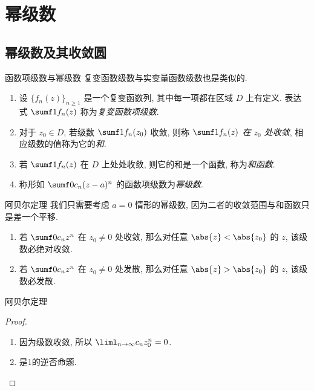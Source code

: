 \section{幂级数}


\subsection{幂级数及其收敛圆}

\begin{frame}{函数项级数与幂级数}
	\onslide<+->
	复变函数级数与实变量函数级数也是类似的.
	\onslide<+->
	\begin{definition}[near]
		\begin{enumerate}
			\item 设 $\{f_n(z)\}_{n\ge 1}$ 是一个复变函数列, 其中每一项都在区域 $D$ 上有定义.
			表达式 $\sumf1 f_n(z)$ 称为\emph{复变函数项级数}.
			\item 对于 $z_0\in D$, 若级数 $\sumf1 f_n(z_0)$ 收敛, 则称 \emph{$\sumf1 f_n(z)$ 在 $z_0$ 处收敛}, 相应级数的值称为它的\emph{和}.
			\item 若 $\sumf1 f_n(z)$ 在 $D$ 上处处收敛, 则它的和是一个函数, 称为\emph{和函数}.
			\item 称形如 $\sumf0 c_n(z-a)^n$ 的函数项级数为\emph{幂级数}.
		\end{enumerate}\meddel
	\end{definition}
\end{frame}


\begin{frame}{阿贝尔定理}
	\onslide<+->
	我们只需要考虑 $a=0$ 情形的幂级数, 因为二者的收敛范围与和函数只是差一个平移.
	\onslide<+->
	\begin{theorem*}[][阿贝尔定理]
		\begin{enumerate}
			\item 若 $\sumf0 c_nz^n$ 在 $z_0\neq 0$ 处收敛, 那么对任意 $\abs{z}<\abs{z_0}$ 的 $z$, 该级数必绝对收敛.
			\item 若 $\sumf0 c_nz^n$ 在 $z_0\neq 0$ 处发散, 那么对任意 $\abs{z}>\abs{z_0}$ 的 $z$, 该级数必发散.
		\end{enumerate}
	\end{theorem*}
\end{frame}


\begin{frame}{阿贝尔定理}
	\onslide<+->
	\begin{proof}
		\begin{enumerate}
			\item 因为级数收敛, 所以 $\liml_{n\to\infty}c_n z_0^n=0$.
			\onslide<+->{%
				所以级数在 $z$ 处绝对收敛.
			}
			\item 是\enumnum1的逆否命题.\qedhere
		\end{enumerate}
	\end{proof}
\end{frame}


